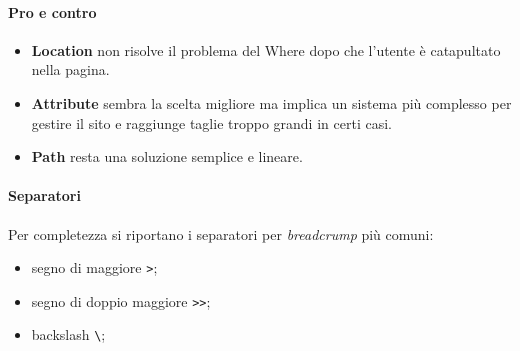 				\paragraph{Pro e contro}
					\begin{itemize}
						\item \textbf{Location} non risolve il problema del Where dopo che l'utente è catapultato nella pagina.
						\item \textbf{Attribute} sembra la scelta migliore ma implica un sistema più complesso per gestire il sito e raggiunge taglie troppo grandi in certi casi.
						\item \textbf{Path} resta una soluzione semplice e lineare.
					\end{itemize}
				
				\paragraph{Separatori}
					Per completezza si riportano i separatori per \emph{breadcrump} più comuni:
					\begin{itemize}
						\item segno di maggiore \verb|>|;
						\item segno di doppio maggiore \verb|>>|;
						\item backslash \verb|\|;
					\end{itemize}
				